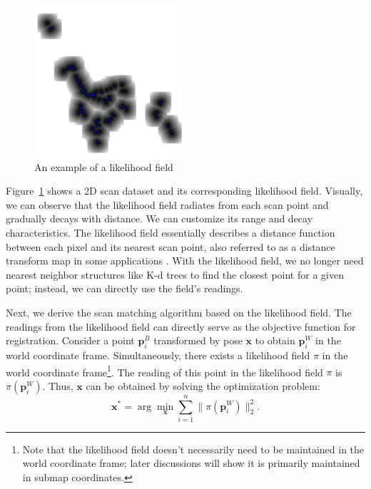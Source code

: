 \begin{figure}[!htp]
	\centering
	\includegraphics[width=0.5\textwidth]{resources/2d-lidar-mapping/likelihood-field}
	\caption{An example of a likelihood field}
	\label{fig:likelihood-field}
\end{figure}

Figure~\ref{fig:likelihood-field} shows a 2D scan dataset and its corresponding likelihood field. Visually, we can observe that the likelihood field radiates from each scan point and gradually decays with distance. We can customize its range and decay characteristics. The likelihood field essentially describes a distance function between each pixel and its nearest scan point, also referred to as a distance transform map in some applications \cite{Felzenszwalb2012}. With the likelihood field, we no longer need nearest neighbor structures like K-d trees to find the closest point for a given point; instead, we can directly use the field's readings.

Next, we derive the scan matching algorithm based on the likelihood field. The readings from the likelihood field can directly serve as the objective function for registration. Consider a point $\mathbf{p}^B_i$ transformed by pose $\mathbf{x}$ to obtain $\mathbf{p}^W_i$ in the world coordinate frame. Simultaneously, there exists a likelihood field $\pi$ in the world coordinate frame\footnote{Note that the likelihood field doesn't necessarily need to be maintained in the world coordinate frame; later discussions will show it is primarily maintained in submap coordinates.}. The reading of this point in the likelihood field $\pi$ is $\pi(\mathbf{p}^W_i)$. Thus, $\mathbf{x}$ can be obtained by solving the optimization problem:
\begin{equation}\label{key}
	\mathbf{x}^* = \arg \min_{\mathbf{x}} \sum_{i=1}^{n} \| \pi(\mathbf{p}_i^W) \|_2^2.
\end{equation}

